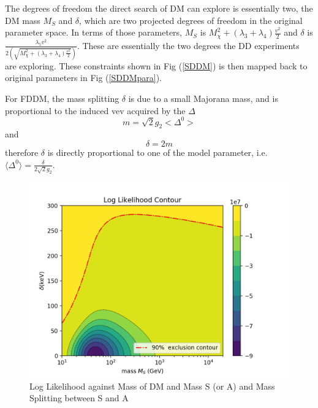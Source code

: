 \documentclass[12pt]{article}
\begin{document}
The degrees of freedom the direct search of DM can explore is essentially two, the DM mass $M_S$ and $\delta$, which are two projected degrees of freedom in the original parameter space. In terms of those parameters, $M_S$ is $M_\chi^2+(\lambda_3+\lambda_4)\frac{v^2}{2}$ and $\delta$ is $ \frac{\lambda_5v^2}{2(\sqrt{M_\chi^2 + (\lambda_3 + \lambda_4) \frac{v^2}{2}})}$. These are essentially the two degrees the DD experiments are exploring. These constraints shown in Fig (\ref{SDDM}) is then mapped back to original parameters in Fig (\ref{SDDMpara}). 




For FDDM, the mass splitting $\delta$ is due to a small Majorana mass, and is proportional to the induced vev acquired by the $\Delta$ 
$$
m=\sqrt 2 g_2 <\Delta^0>
$$
and 
$$
\delta=2m
$$
therefore $\delta$ is directly proportional to one of the model parameter, i.e. $  \langle \Delta^0  \rangle = \frac{\delta}{2\sqrt 2g_2}$. 

\begin{figure}
\includegraphics{figure_1.png}
\caption{Log Likelihood against Mass of DM and Mass S (or A) and Mass Splitting between S and A} \label{FDDM}
\end{figure}
\end{document}
